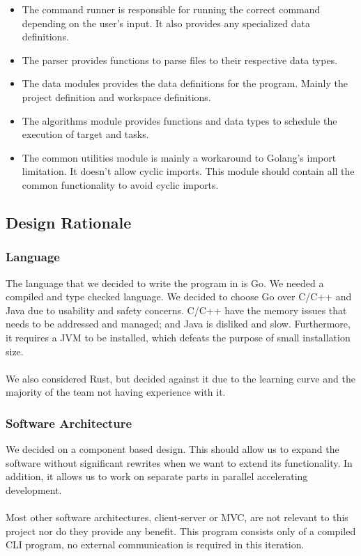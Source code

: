 \documentclass[11pt]{article}
\begin{document}
\begin{itemize}
\item The command runner is responsible for running the correct command
  depending on the user's input. It also provides any specialized data definitions.

\item The parser provides functions to parse files to their respective data types.

\item The data modules provides the data definitions for the program. Mainly the
  \gls{project definition} and workspace definitions.

\item The algorithms module provides functions and data types to schedule the
  execution of \gls{target} and tasks.

\item The common utilities module is mainly a workaround to Golang's import
  limitation. It doesn't allow cyclic imports. This module should contain all
  the common functionality to avoid cyclic imports.
\end{itemize}

\subsection{Design Rationale}
\subsubsection{Language}
\label{sec:lang}

The language that we decided to write the program in is Go. We needed a compiled
and type checked language. We decided to choose Go over C/C++ and Java due to usability and
safety concerns. C/C++ have the memory issues that needs to be addressed and managed; and
Java is disliked and slow. Furthermore, it requires a JVM to be installed, which
defeats the purpose of small installation size.
\\\\
We also considered Rust, but decided against it due to the learning curve and
the majority of the team not having experience with it.

\subsubsection{Software Architecture}

We decided on a component based design. This should allow us to expand the
software without significant rewrites when we want to extend its functionality.
In addition, it allows us to work on separate parts in parallel accelerating
development.
\\\\
Most other software architectures, client-server or MVC, are not relevant to
this project nor do they provide any benefit. This program consists only of a
compiled CLI program, no external communication is required in this iteration.
\end{document}
